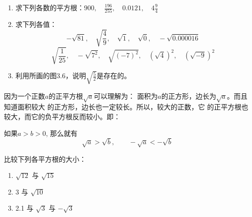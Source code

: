 \begin{ex}
\begin{enumerate}
    \item 求下列各数的平方根：$900,\quad 
    \frac{196}{255},\quad 0.0121,\quad 4\frac{9}{4}$

\item 求下列各值：
\[-\sqrt{81},\quad \sqrt{\frac{4}{9}},\quad \sqrt{1},\quad \sqrt{0},\quad -\sqrt{0.000016}\]
\[\sqrt{\frac{1}{25}},\quad -\sqrt{7^2},\quad \sqrt{(-7)^2},\quad \left(\sqrt{4}\right)^2,\quad \left(\sqrt{-9}\right)^2\]

\item 利用所画的图3.6，说明$\sqrt{\frac{5}{2}}$是存在的。
 \end{enumerate}
\end{ex}


\begin{figure}[htp]
    \centering
    \caption{}
\end{figure}

因为一个正数$a$的正平方根$\sqrt{a}$可以理解为：
面积为$a$的正方形，边长为$\sqrt{a}$。而且知道面积较大
的正方形，边长也一定较长。所以，较大的正数，它
的正平方根也较大，而它的负平方根反而较小。即：

\begin{blk}{}
    如果$a>b>0$, 那么就有
    $$\sqrt{a}>\sqrt{b},\qquad -\sqrt{a}<-\sqrt{b}$$
\end{blk}

 
\begin{example}
比较下列各平方根的大小：
\begin{enumerate}
    \item $\sqrt{12}$ 与 $\sqrt{15}$
    \item 3 与 $\sqrt{10}$
    \item 2.1 与 $\sqrt{3}$ 与 $-\sqrt{3}$
\end{enumerate}
\end{example}


